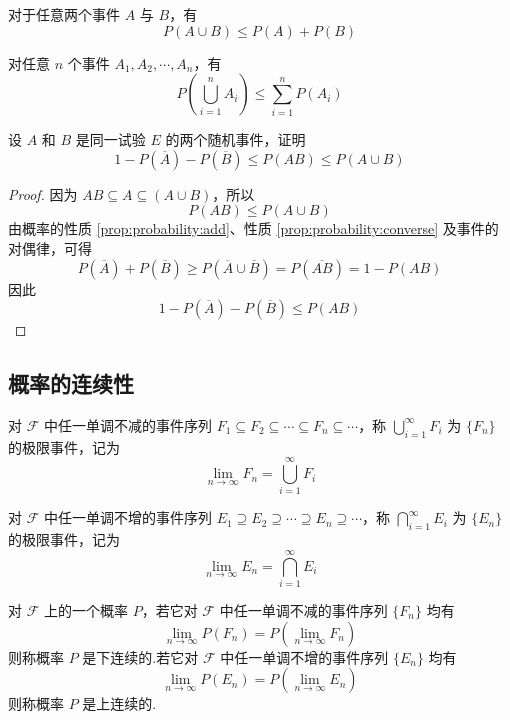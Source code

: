 \begin{corollary}[][半可加性]
    \indent 对于任意两个事件 $A$ 与 $B$，有
    \begin{equation}
        P(A \cup B) \leqslant P(A) + P(B)
    \end{equation}

    对任意 $n$ 个事件 $A_1,A_2,\cdots,A_n$，有
    \begin{equation}
        P \left(\bigcup_{i=1}^n A_i \right) \leqslant \sum_{i=1}^n P(A_i)
    \end{equation}
\end{corollary}

\begin{example}
    \indent 设 $A$ 和 $B$ 是同一试验 $E$ 的两个随机事件，证明
    $$
    1 - P(\overline{A}) - P(\overline{B}) \leqslant P(AB) \leqslant P(A \cup B)
    $$
\end{example}

\begin{proof}
    因为 $AB \subseteq A \subseteq (A \cup B)$，所以
    $$
    P(AB) \leqslant P(A \cup B)
    $$
    由概率的性质 \ref{prop:probability:add}、性质 \ref{prop:probability:converse} 及事件的对偶律，可得
    $$
    P(\overline{A}) + P(\overline{B}) \geqslant P(\overline{A} \cup \overline{B}) = P(\overline{AB}) = 1 - P(AB)
    $$
    因此
    $$
    1 - P(\overline{A}) - P(\overline{B}) \leqslant P(AB)
    $$
\end{proof}

\subsection{概率的连续性}

\begin{definition}
    \indent 对 $\mathcal{F}$ 中任一单调不减的事件序列 $F_1 \subseteq F_2 \subseteq \cdots \subseteq F_n \subseteq \cdots$，称 $\displaystyle\bigcup_{i=1}^{\infty} F_i$ 为 $\{F_n\}$ 的{\heiti 极限事件}，记为
    $$
    \lim_{n \to \infty} F_n = \bigcup_{i=1}^{\infty} F_i
    $$

    对 $\mathcal{F}$ 中任一单调不增的事件序列 $E_1 \supseteq E_2 \supseteq \cdots \supseteq E_n \supseteq \cdots$，称 $\displaystyle\bigcap_{i=1}^{\infty} E_i$ 为 $\{E_n\}$ 的{\heiti 极限事件}，记为
    $$
    \lim_{n \to \infty} E_n = \bigcap_{i=1}^{\infty} E_i
    $$
\end{definition}

\begin{definition}
    \indent 对 $\mathcal{F}$ 上的一个概率 $P$，若它对 $\mathcal{F}$ 中任一单调不减的事件序列 $\{F_n\}$ 均有
    $$
    \lim_{n \to \infty} P(F_n) = P(\lim_{n \to \infty} F_n)
    $$
    则称概率 $P$ 是{\heiti 下连续}的.若它对 $\mathcal{F}$ 中任一单调不增的事件序列 $\{E_n\}$ 均有
    $$
    \lim_{n \to \infty} P(E_n) = P(\lim_{n \to \infty} E_n)
    $$
    则称概率 $P$ 是{\heiti 上连续}的.
\end{definition}

